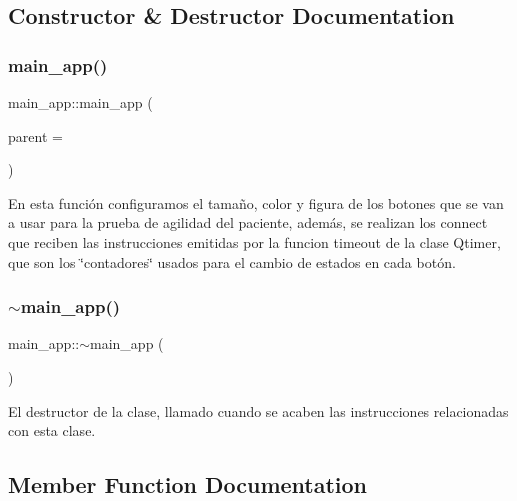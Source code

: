 \subsection{Constructor \& Destructor Documentation}
\mbox{\label{classmain__app_a1d4b63e6e6a588b6d0baf8ad4cc646ce}} 
\subsubsection{\texorpdfstring{main\+\_\+app()}{main\_app()}}
{\footnotesize\ttfamily main\+\_\+app\+::main\+\_\+app (\begin{DoxyParamCaption}\item[{Q\+Widget $\ast$}]{parent = {} }\end{DoxyParamCaption})\hspace{0.3cm}{\ttfamily [explicit]}}

En esta función configuramos el tamaño, color y figura de los botones que se van a usar para la prueba de agilidad del paciente, además, se realizan los connect que reciben las instrucciones emitidas por la funcion timeout de la clase Qtimer, que son los \char`\"{}contadores\char`\"{} usados para el cambio de estados en cada botón. \mbox{\label{classmain__app_af8831d188195a6ac241250985377a7be}} 
\subsubsection{\texorpdfstring{$\sim$main\+\_\+app()}{~main\_app()}}
{\footnotesize\ttfamily main\+\_\+app\+::$\sim$main\+\_\+app (\begin{DoxyParamCaption}{ }\end{DoxyParamCaption})}

El destructor de la clase, llamado cuando se acaben las instrucciones relacionadas con esta clase. 

\subsection{Member Function Documentation}
\mbox{\label{classmain__app_a981265dad144f9c9764c6f263f0dc461}} 
